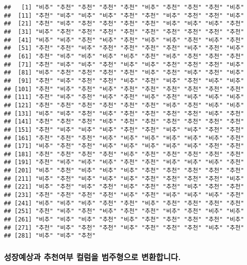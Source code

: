 \documentclass[]{article}
\begin{document}
\begin{verbatim}
##   [1] "비추" "추천" "추천" "추천" "추천" "비추" "추천" "추천" "추천" "비추"
##  [11] "추천" "비추" "비추" "비추" "추천" "추천" "비추" "추천" "추천" "비추"
##  [21] "추천" "비추" "추천" "추천" "추천" "추천" "비추" "비추" "비추" "추천"
##  [31] "비추" "추천" "추천" "추천" "추천" "추천" "추천" "추천" "추천" "추천"
##  [41] "비추" "비추" "추천" "비추" "추천" "비추" "비추" "추천" "비추" "추천"
##  [51] "추천" "추천" "비추" "추천" "추천" "추천" "추천" "비추" "추천" "비추"
##  [61] "추천" "비추" "비추" "비추" "비추" "추천" "비추" "추천" "추천" "추천"
##  [71] "추천" "비추" "비추" "추천" "비추" "비추" "추천" "추천" "추천" "비추"
##  [81] "비추" "추천" "추천" "추천" "추천" "비추" "추천" "비추" "추천" "비추"
##  [91] "추천" "비추" "추천" "추천" "비추" "추천" "비추" "추천" "비추" "비추"
## [101] "추천" "비추" "추천" "비추" "추천" "추천" "추천" "추천" "추천" "추천"
## [111] "추천" "비추" "추천" "비추" "추천" "비추" "추천" "비추" "비추" "비추"
## [121] "추천" "추천" "추천" "추천" "추천" "추천" "비추" "추천" "비추" "비추"
## [131] "비추" "비추" "추천" "비추" "추천" "추천" "추천" "추천" "비추" "추천"
## [141] "추천" "추천" "추천" "비추" "추천" "추천" "추천" "추천" "추천" "추천"
## [151] "추천" "비추" "비추" "비추" "추천" "추천" "비추" "비추" "추천" "추천"
## [161] "추천" "추천" "추천" "비추" "비추" "비추" "비추" "비추" "비추" "추천"
## [171] "비추" "추천" "추천" "비추" "비추" "비추" "비추" "비추" "추천" "추천"
## [181] "추천" "추천" "추천" "추천" "비추" "추천" "추천" "추천" "추천" "추천"
## [191] "추천" "비추" "비추" "비추" "추천" "추천" "비추" "비추" "비추" "추천"
## [201] "비추" "추천" "비추" "비추" "비추" "추천" "추천" "추천" "추천" "추천"
## [211] "비추" "추천" "비추" "비추" "비추" "추천" "추천" "추천" "추천" "비추"
## [221] "비추" "추천" "비추" "추천" "비추" "추천" "추천" "비추" "추천" "추천"
## [231] "추천" "추천" "추천" "추천" "비추" "추천" "비추" "비추" "비추" "추천"
## [241] "비추" "비추" "비추" "추천" "추천" "비추" "추천" "추천" "추천" "추천"
## [251] "추천" "비추" "추천" "비추" "추천" "추천" "비추" "추천" "비추" "비추"
## [261] "비추" "비추" "비추" "추천" "비추" "추천" "추천" "추천" "추천" "비추"
## [271] "추천" "비추" "추천" "추천" "비추" "추천" "추천" "추천" "비추" "추천"
## [281] "비추" "비추" "추천"
\end{verbatim}

\subsubsection{성장예상과 추천여부 컬럼을 범주형으로
변환합니다.}\label{----.}
\end{document}
